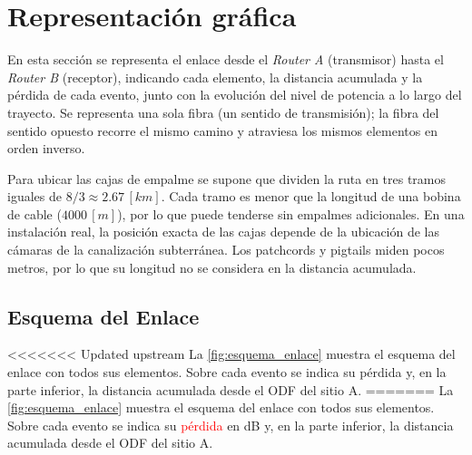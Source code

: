 \section{Representación gráfica}
\label{sec_4}
En esta sección se representa el enlace desde el \textit{Router A} (transmisor) hasta el \textit{Router B} (receptor), indicando cada elemento, la distancia acumulada y la pérdida de cada evento, junto con la evolución del nivel de potencia a lo largo del trayecto. Se representa una sola fibra (un sentido de transmisión); la fibra del sentido opuesto recorre el mismo camino y atraviesa los mismos elementos en orden inverso.

Para ubicar las cajas de empalme se supone que dividen la ruta en tres tramos iguales de $8/3 \approx 2.67 \, [km]$. Cada tramo es menor que la longitud de una bobina de cable ($4000 \, [m]$), por lo que puede tenderse sin empalmes adicionales. En una instalación real, la posición exacta de las cajas depende de la ubicación de las cámaras de la canalización subterránea. Los patchcords y pigtails miden pocos metros, por lo que su longitud no se considera en la distancia acumulada.


\subsection{Esquema del Enlace}
\label{sec_4.1}
<<<<<<< Updated upstream
La \autoref{fig:esquema_enlace} muestra el esquema del enlace con todos sus elementos. Sobre cada evento se indica su pérdida y, en la parte inferior, la distancia acumulada desde el ODF del sitio A.
=======
La \autoref{fig:esquema_enlace} muestra el esquema del enlace con todos sus elementos. Sobre cada evento se indica su \textcolor{red}{pérdida} en dB y, en la parte inferior, la distancia acumulada desde el ODF del sitio A.


